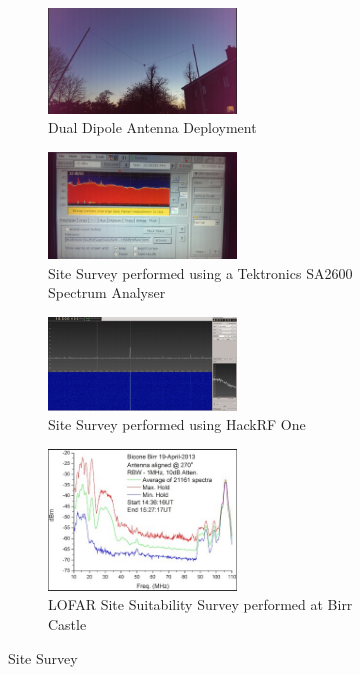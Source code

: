 %
\begin{figure}	
	\centering
	\begin{subfigure}[t]{5cm}
		\centering
		\includegraphics[width=5cm]{images/32}
		\caption{Dual Dipole Antenna Deployment}
		\label{fig:dual_dipole_deployed}
	\end{subfigure}
	\quad
	\begin{subfigure}[t]{5cm}
		\centering
		\includegraphics[width=5cm]{images/26}
		\caption{Site Survey performed using a Tektronics SA2600 Spectrum Analyser}
		\label{fig:site_survey_spec_analyser}
	\end{subfigure}
	\quad
	\begin{subfigure}[t]{5cm}
		\centering
		\includegraphics[width=5cm]{images/31}
		\caption{Site Survey performed using HackRF One}
		\label{fig:site_survey_hackrf}
	\end{subfigure}
	\quad
	\begin{subfigure}[t]{5cm}
		\centering
		\includegraphics[width=5cm]{images/35}
		\caption{LOFAR Site Suitability Survey performed at Birr Castle \citep{craf-13}}
		\label{fig:site_survey_lofar}
	\end{subfigure}
	\caption{Site Survey}
	\label{fig:site_survey}
\end{figure}
%

